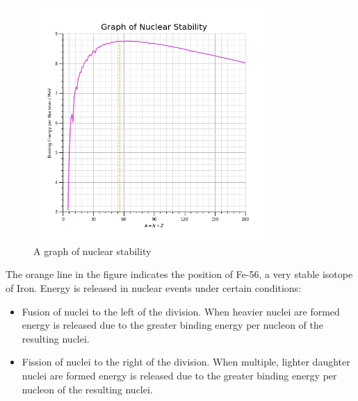 \documentclass[12pt]{article}
\begin{document}
\begin{figure}[H]
\centering
\includegraphics[width=0.8\textwidth,keepaspectratio]{./images/nuclear_stability.png}
\caption{A graph of nuclear stability}
\end{figure}

The orange line in the figure indicates the position of Fe-56, a very stable isotope of Iron. Energy is released in nuclear events under certain conditions:

\begin{itemize}
\item Fusion of nuclei to the left of the division. When heavier nuclei are formed energy is released due to the greater binding energy per nucleon of the resulting nuclei.

\item Fission of nuclei to the right of the division. When multiple, lighter daughter nuclei are formed energy is released due to the greater binding energy per nucleon of the resulting nuclei.
\end{itemize}
\end{document}
